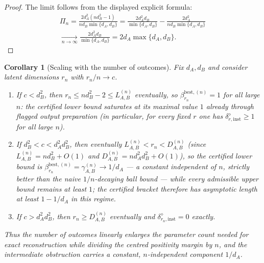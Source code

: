 \documentclass[11pt,a4paper]{article}
\newtheorem{corollary}[theorem]{Corollary}
\begin{document}
\begin{proof}
The limit follows from the displayed explicit formula:
\begin{gather*}
\Pi_n=\frac{2d_A^2(nd_B^2-1)}{nd_B\min\{d_A,d_B\}}
=\frac{2d_A^2d_B}{\min\{d_A,d_B\}}-\frac{2d_A^2}{nd_B\min\{d_A,d_B\}}\\
\xrightarrow[n\to\infty]{}\frac{2d_A^2d_B}{\min\{d_A,d_B\}}
=2d_A\max\{d_A,d_B\}.
\end{gather*}
\end{proof}

\begin{corollary}[Scaling with the number of outcomes]
\label{cor:scaling}
Fix $d_A,d_B$ and consider latent dimensions $r_n$ with $r_n/n\to c$.
\begin{enumerate}[leftmargin=*,itemsep=2pt]
\item If $c<d_B^2$, then $r_n\le nd_B^2-2\le L_{A,B}^{(n)}$ eventually, so $\beta_{r_n}^{\mathrm{best},(n)}=1$ for all large $n$: the certified lower bound saturates at its maximal value $1$ already through flagged output preparation (in particular, for every fixed $r$ one has $\delta_{r,\mathrm{inst}}^{\diamond}\ge1$ for all large $n$).
\item If $d_B^2<c<d_A^2d_B^2$, then eventually $L_{A,B}^{(n)}<r_n<D_{A,B}^{(n)}$ (since $L_{A,B}^{(n)}=nd_B^2+O(1)$ and $D_{A,B}^{(n)}=nd_A^2d_B^2+O(1)$), so the certified lower bound is $\beta_{r_n}^{\mathrm{best},(n)}=\gamma_{A,B}^{(n)}\to1/d_A$ --- a constant independent of $n$, strictly better than the naive $1/n$-decaying ball bound --- while every admissible upper bound remains at least $1$; the certified bracket therefore has asymptotic length at least $1-1/d_A$ in this regime.
\item If $c>d_A^2d_B^2$, then $r_n\ge D_{A,B}^{(n)}$ eventually and $\delta_{r_n,\mathrm{inst}}^{\diamond}=0$ exactly.
\end{enumerate}
Thus the number of outcomes linearly enlarges the parameter count needed for exact reconstruction while dividing the centred positivity margin by $n$, and the intermediate obstruction carries a constant, $n$-independent component $1/d_A$.
\end{corollary}
\end{document}
